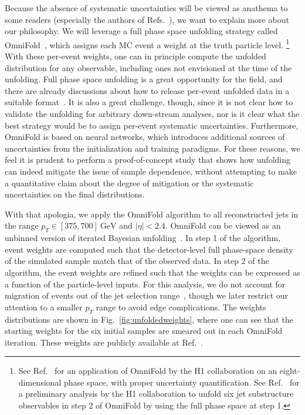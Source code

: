 \documentclass[aps,prd,twocolumn,preprintnumbers,nofootinbib,longbibliography,floatfix]{revtex4-1}
\DeclareRobustCommand{\Fig}[1]{Fig.~\ref{#1}}
\DeclareRobustCommand{\Ref}[1]{Ref.~\cite{#1}}
\DeclareRobustCommand{\Refs}[1]{Refs.~\cite{#1}}
\newcommand{\GeV}{\text{GeV}}
\newcommand{\OmniFold}{{\sc OmniFold}\xspace}
\newcommand{\cortwo}[1]{#1}
\begin{document}
Because the absence of systematic uncertainties will be viewed as anathema to some readers (especially the authors of \Refs{ATLAS:2019rqw,CMS:2021iwu}), we want to explain more about our philosophy.
%
We will leverage a full phase space unfolding strategy called \OmniFold~\cite{Andreassen:2019cjw,Andreassen:2021zzk}, which assigns each MC event a weight at the truth particle level.%
%
\footnote{See \Ref{H1:2021wkz} for an application of \OmniFold by the H1 collaboration on an eight-dimensional phase space, with proper uncertainty quantification.  See \Ref{H1prelim-22-034} for a preliminary analysis by the H1 collaboration to unfold six jet substructure observables in step 2 of \OmniFold by using the full phase space at step 1.}
%
With these per-event weights, one can in principle compute the unfolded distribution for any observable, including ones not envisioned at the time of the unfolding.
%
Full phase space unfolding is a great opportunity for the field, and there are already discussions about how to release per-event unfolded data in a suitable format~\cite{Arratia:2021otl}.
%
It is also a great challenge, though, since it is not clear how to validate the unfolding for arbitrary down-stream analyses, nor is it clear what the best strategy would be to assign per-event systematic uncertainties.
%
Furthermore, \OmniFold is based on neural networks, which introduces additional sources of uncertainties from the initialization and training paradigms.
%
For these reasons, we feel it is prudent to perform a proof-of-concept study that shows how unfolding can indeed mitigate the issue of sample dependence, without attempting to make a quantitative claim about the degree of mitigation or the systematic uncertainties on the final distributions.




With that apologia, we apply the \OmniFold algorithm to all reconstructed jets in the range $p_T \in [375,700]~\GeV$ and $|\eta| < 2.4$.
%
\OmniFold can be viewed as an unbinned version of iterated Bayesian unfolding~\cite{DAGOSTINI1995487}.
%
In step 1 of the algorithm, event weights are computed such that the detector-level \cortwo{full phase-space density} of the simulated sample match that of the observed data.
%
In step 2 of the algorithm, the event weights are refined such that the weights can be expressed as a function of the particle-level inputs.
%
For this analysis, we do not account for migration of events out of the jet selection range~\cite{Andreassen:2021zzk}, though we later restrict our attention to a smaller $p_T$ range to avoid edge complications.
%
The weights distributions are shown in \Fig{fig:unfoldedweights}, where one can see that the starting weights for the six initial samples are smeared out in each \OmniFold iteration.
%
These weights are publicly available at \Ref{MOD:ZenodoCMSOmniFold}.
\end{document}
